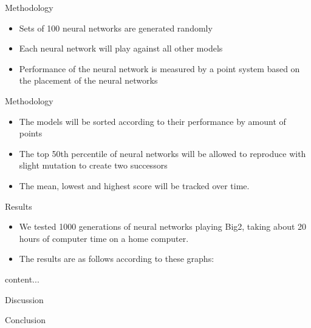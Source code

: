 \documentclass{beamer}
\begin{document}
\begin{frame}{Methodology}
	
	\begin{itemize}
	
		\item Sets of 100 neural networks are generated randomly
		\item Each neural network will play against all other models
		\item Performance of the neural network is measured by a point system based on the placement of the neural networks
		
	\end{itemize}
	
\end{frame}

\begin{frame}{Methodology}
	
	\begin{itemize}
		
		\item The models will be sorted according to their performance by amount of points
		\item The top 50th percentile of neural networks will be allowed to reproduce with slight mutation to create two successors
		\item The mean, lowest and highest score will be tracked over time.
		
	\end{itemize}
	
\end{frame}

\begin{frame}{Results}
	
	\begin{itemize}
		\item We tested 1000 generations of neural networks playing Big2, taking about 20 hours of computer time on a home computer.
		\item The results are as follows according to these graphs:
	\end{itemize}
	
\end{frame}

\begin{frame}
	content...
\end{frame}

\begin{frame}{Discussion}
	
\end{frame}

\begin{frame}{Conclusion}

\end{frame}
\end{document}
